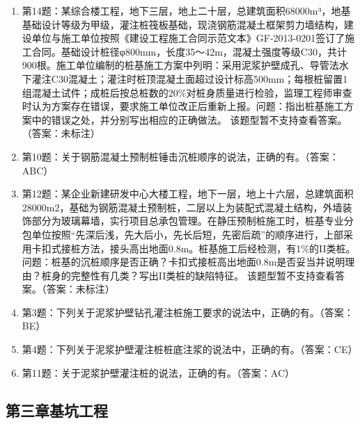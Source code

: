 \documentclass[UTF8,fontset=fandol,11pt]{ctexart}
\newcommand{\sectitle}[1]{\vspace{0.5em}\noindent{\Large\bfseries\color{mainblue}#1}\par\vspace{0.25em}{\color{mainorange}\hrule height 1.2pt}\vspace{0.45em}}
\begin{document}
\begin{enumerate}[label=\arabic*.]

\item 第14题：某综合楼工程，地下三层，地上二十层，总建筑面积68000m³，地基基础设计等级为甲级，灌注桩筏板基础，现浇钢筋混凝土框架剪力墙结构，建设单位与施工单位按照《建设工程施工合同示范文本》GF-2013-0201签订了施工合同。基础设计桩径φ800mm，长度35～42m，混凝土强度等级C30，共计900根。施工单位编制的桩基施工方案中列明：采用泥浆护壁成孔、导管法水下灌注C30混凝土；灌注时桩顶混凝土面超过设计标高500mm；每根桩留置1组混凝土试件；成桩后按总桩数的20\%对桩身质量进行检验，监理工程师审查时认为方案存在错误，要求施工单位改正后重新上报。问题：指出桩基施工方案中的错误之处，并分别写出相应的正确做法。 该题型暂不支持查看答案。（答案：未标注）

\item 第10题：关于钢筋混凝土预制桩锤击沉桩顺序的说法，正确的有。（答案：ABC）

\item 第12题：某企业新建研发中心大楼工程，地下一层，地上十六层，总建筑面积 28000m2，基础为钢筋混凝土预制桩，二层以上为装配式混凝土结构，外墙装饰部分为玻璃幕墙，实行项目总承包管理。在静压预制桩施工时，桩基专业分包单位按照“先深后浅，先大后小，先长后短，先密后疏”的顺序进行，上部采用卡扣式接桩方法，接头高出地面0.8m。桩基施工后经检测，有1\%的II类桩。问题：桩基的沉桩顺序是否正确？卡扣式接桩高出地面0.8m是否妥当并说明理由？桩身的完整性有几类？写出II类桩的缺陷特征。 该题型暂不支持查看答案。（答案：未标注）

\item 第3题：下列关于泥浆护壁钻孔灌注桩施工要求的说法中，正确的有。（答案：BE）

\item 第4题：下列关于泥浆护壁灌注桩桩底注浆的说法中，正确的有。（答案：CE）

\item 第11题：关于泥浆护壁灌注桩的说法，正确的有。（答案：AC）

\end{enumerate}

\newpage

\subsection*{第三章基坑工程}

\sectitle{PPT 重点压缩}
\end{document}
